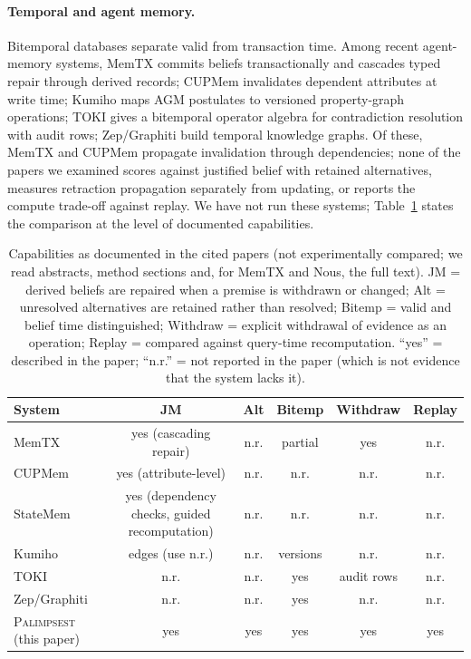 \documentclass[11pt]{article}
\newcommand{\pal}{\textsc{Palimpsest}}
\begin{document}
\paragraph{Temporal and agent memory.} Bitemporal databases \citep{snodgrass} separate valid from transaction time. Among recent agent-memory systems, MemTX \citep{memtx2026} commits beliefs transactionally and cascades typed repair through derived records; CUPMem \citep{stale2026} invalidates dependent attributes at write time; Kumiho \citep{kumiho2026} maps AGM postulates to versioned property-graph operations; TOKI \citep{toki2026} gives a bitemporal operator algebra for contradiction resolution with audit rows; Zep/Graphiti \citep{graphiti2025} build temporal knowledge graphs. Of these, MemTX and CUPMem propagate invalidation through dependencies; none of the papers we examined scores against justified belief with retained alternatives, measures retraction propagation separately from updating, or reports the compute trade-off against replay. We have not run these systems; Table~\ref{tab:cap} states the comparison at the level of documented capabilities.
\begin{table}[t]\centering\small
\caption{Capabilities as documented in the cited papers (not experimentally compared; we read abstracts, method sections and, for MemTX and Nous, the full text). JM = derived beliefs are repaired when a premise is withdrawn or changed; Alt = unresolved alternatives are retained rather than resolved; Bitemp = valid and belief time distinguished; Withdraw = explicit withdrawal of evidence as an operation; Replay = compared against query-time recomputation. ``yes'' = described in the paper; ``n.r.'' = not reported in the paper (which is not evidence that the system lacks it).}\label{tab:cap}
\begin{tabular}{lccccc}\toprule
System & JM & Alt & Bitemp & Withdraw & Replay \\\midrule
MemTX \citep{memtx2026} & yes (cascading repair) & n.r. & partial & yes & n.r. \\
CUPMem \citep{stale2026} & yes (attribute-level) & n.r. & n.r. & n.r. & n.r. \\
StateMem \citep{statemembench2026} & yes (dependency checks, guided recomputation) & n.r. & n.r. & n.r. & n.r. \\
Kumiho \citep{kumiho2026} & edges (use n.r.) & n.r. & versions & n.r. & n.r. \\
TOKI \citep{toki2026} & n.r. & n.r. & yes & audit rows & n.r. \\
Zep/Graphiti \citep{graphiti2025} & n.r. & n.r. & yes & n.r. & n.r. \\
\pal{} (this paper) & yes & yes & yes & yes & yes \\\bottomrule
\end{tabular}
\end{table}
\end{document}
